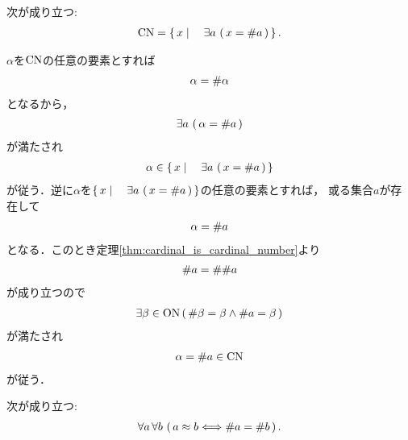 	\begin{screen}
		\begin{thm}[$\CN$は濃度の全体である]
			次が成り立つ:
			\begin{align}
				\mathrm{CN} = \left\{\, x \mid \quad \exists a\, \left(\, x = \# a\, \right)\, \right\}.
			\end{align}
		\end{thm}
	\end{screen}
	
	\begin{sketch}
		$\alpha$を$\CN$の任意の要素とすれば
		\begin{align}
			\alpha = \# \alpha
		\end{align}
		となるから，
		\begin{align}
			\exists a\, \left(\, \alpha = \# a\, \right)
		\end{align}
		が満たされ
		\begin{align}
			\alpha \in \left\{\, x \mid \quad \exists a\, \left(\, x = \# a\, \right)\, \right\}
		\end{align}
		が従う．逆に$\alpha$を$\left\{\, x \mid \quad \exists a\, \left(\, x = \# a\, \right)\, \right\}$の任意の要素とすれば，
		或る集合$a$が存在して
		\begin{align}
			\alpha = \# a
		\end{align}
		となる．このとき定理\ref{thm:cardinal_is_cardinal_number}より
		\begin{align}
			\# a = \# \# a
		\end{align}
		が成り立つので
		\begin{align}
			\exists \beta \in \mathrm{ON}\, (\, \# \beta = \beta \wedge \# a = \beta\, )
		\end{align}
		が満たされ
		\begin{align}
			\alpha = \# a \in \mathrm{CN}
		\end{align}
		が従う．
		\QED
	\end{sketch}
	
	\begin{screen}
		\begin{thm}
			次が成り立つ:
			\begin{align}
				\forall a\, \forall b\, \left(\, a \approx b \Longleftrightarrow \# a = \# b\, \right).
			\end{align}
		\end{thm}
	\end{screen}
	
